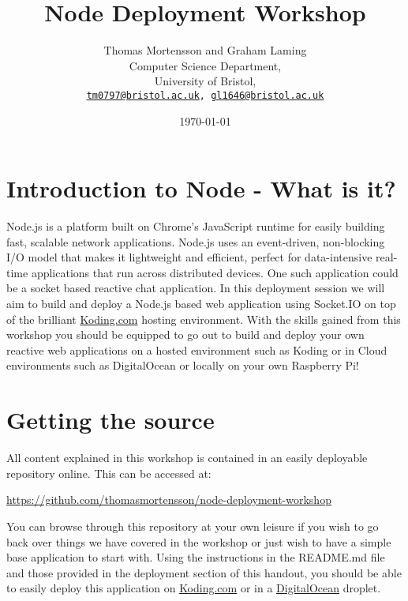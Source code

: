 \documentclass[twocolumn]{article}
\begin{document}
\lstset{style=Style1}

\title{Node Deployment Workshop} 
\author{Thomas Mortensson and Graham Laming\\
        	Computer Science Department,\\
		University of Bristol,\\
		\texttt{\href{mailto:tm0797@bristol.ac.uk}{tm0797@bristol.ac.uk}, \href{mailto:gl1646@bristol.ac.uk}{gl1646@bristol.ac.uk}} 
		}
\date{\today} 
\maketitle

\section{Introduction to Node - What is it?}

Node.js is a platform built on Chrome's JavaScript runtime for easily building fast, scalable network applications. Node.js uses an event-driven, non-blocking I/O model that makes it lightweight and efficient, perfect for data-intensive real-time applications that run across distributed devices. One such application could be a socket based reactive chat application. In this deployment session we will aim to build and deploy a Node.js based web application using Socket.IO on top of the brilliant \href{http://koding.com}{Koding.com} hosting environment. With the skills gained from this workshop you should be equipped to go out to build and deploy your own reactive web applications on a hosted environment such as Koding or in Cloud environments such as DigitalOcean or locally on your own Raspberry Pi!

\section {Getting the source}

All content explained in this workshop is contained in an easily deployable repository online. This can be accessed at:
{\begin{center}
\url{https://github.com/thomasmortensson/node-deployment-workshop}\\
\end{center}
}

You can browse through this repository at your own leisure if you wish to go back over things we have covered in the workshop or just wish to have a simple base application to start with. Using the instructions in the README.md file and those provided in the deployment section of this handout, you should be able to easily deploy this application on \href{http://koding.com}{Koding.com} or in a \href{http://digitalocean.com}{DigitalOcean} droplet.
\end{document}
